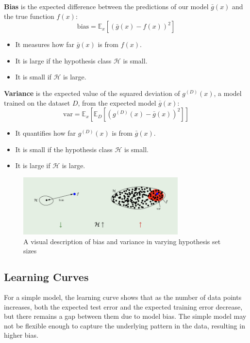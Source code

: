 \textbf{Bias} is the expected difference between the predictions of our model $\bar{g}(x)$ and the true function $f(x)$:
\begin{equation*}
\text{bias} = \mathbb{E}_x \left[ (\bar{g}(x) - f(x))^2 \right]
\end{equation*}
\begin{itemize}
    \item It measures how far $\bar{g}(x)$ is from $f(x)$.
    \item It is large if the hypothesis class $\mathcal{H}$ is small.
    \item It is small if $\mathcal{H}$ is large.
\end{itemize}

\textbf{Variance} is the expected value of the squared deviation of $g^{(D)}(x)$, a model trained on the dataset $D$, from the expected model $\bar{g}(x)$:
\begin{equation*}
\text{var} = \mathbb{E}_x \left[ \mathbb{E}_D \left[ (g^{(D)}(x) - \bar{g}(x))^2 \right] \right]
\end{equation*}
\begin{itemize}
    \item It quantifies how far $g^{(D)}(x)$ is from $\bar{g}(x)$.
    \item It is small if the hypothesis class $\mathcal{H}$ is small.
    \item It is large if $\mathcal{H}$ is large.
\end{itemize}

\begin{figure}[H]
    \centering
\includegraphics[width=0.75\textwidth]{img/bv.png}

    \caption{A visual description of bias and variance in varying hypothesis set sizes}
    \label{fig:bv-tradeoff}
\end{figure}

\subsection{Learning Curves}

For a simple model, the learning curve shows that as the number of data points increases, both the expected test error and the expected training error decrease, but there remains a gap between them due to model bias. The simple model may not be flexible enough to capture the underlying pattern in the data, resulting in higher bias.\\

